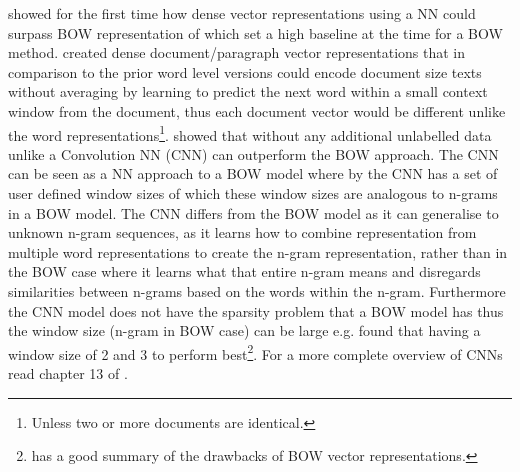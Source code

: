 \citet{le2014distributed} showed for the first time how dense vector representations using a NN could surpass BOW representation of which \citet{wang-manning-2012-baselines} set a high baseline at the time for a BOW method. \citet{le2014distributed} created dense document/paragraph vector representations that in comparison to the prior word level versions \citep{maas-etal-2011-learning} could encode document size texts without averaging by learning to predict the next word within a small context window from the document, thus each document vector would be different unlike the word representations\footnote{Unless two or more documents are identical.}. \citet{johnson-zhang-2015-effective} showed that without any additional unlabelled data unlike \citet{le2014distributed} a Convolution NN (CNN) can outperform the BOW approach. The CNN can be seen as a NN approach to a BOW model where by the CNN has a set of user defined window sizes of which these window sizes are analogous to n-grams in a BOW model. The CNN differs from the BOW model as it can generalise to unknown n-gram sequences, as it learns how to combine representation from multiple word representations to create the n-gram representation, rather than in the BOW case where it learns what that entire n-gram means and disregards similarities between n-grams based on the words within the n-gram. Furthermore the CNN model does not have the sparsity problem that a BOW model has thus the window size (n-gram in BOW case) can be large e.g. \citet{johnson-zhang-2015-effective} found that having a window size of 2 and 3 to perform best\footnote{\citet{le2014distributed} has a good summary of the drawbacks of BOW vector representations.}. For a more complete overview of CNNs read chapter 13 of \citet{goldberg2017neural}.

